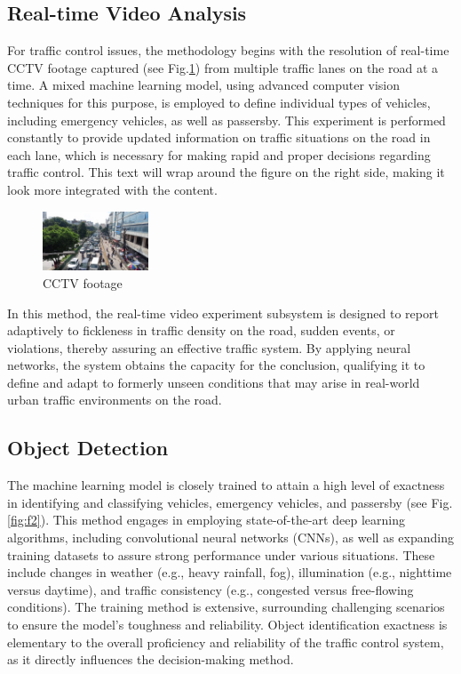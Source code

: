 \documentclass[usenatbib]{tjaa}
\begin{document}
\subsection{Real-time Video Analysis}
For traffic control issues, the methodology begins with the resolution of real-time CCTV footage captured (see Fig.\ref{fig:f1}) from multiple traffic lanes on the road at a time. A mixed machine learning model, using advanced computer vision techniques for this purpose, is employed to define individual types of vehicles, including emergency vehicles, as well as passersby. This experiment is performed constantly to provide updated information on traffic situations on the road in each lane, which is necessary for making rapid and proper decisions regarding traffic control. This text will wrap around the figure on the right side, making it look more integrated with the content.

\begin{figure}
    \centering
    \includegraphics[width=0.28\textwidth]{7.jpg}
    \caption{CCTV footage} %
    \label{fig:f1} %
\end{figure}

In this method, the real-time video experiment subsystem is designed to report adaptively to fickleness in traffic density on the road, sudden events, or violations, thereby assuring an effective traffic system. By applying neural networks, the system obtains the capacity for the conclusion, qualifying it to define and adapt to formerly unseen conditions that may arise in real-world urban traffic environments on the road.

\subsection{Object Detection}
The machine learning model is closely trained to attain a high level of exactness in identifying and classifying vehicles, emergency vehicles, and passersby (see Fig. \ref{fig:f2}). This method engages in employing state-of-the-art deep learning algorithms, including convolutional neural networks (CNNs), as well as expanding training datasets to assure strong performance under various situations. These include changes in weather (e.g., heavy rainfall, fog), illumination (e.g., nighttime versus daytime), and traffic consistency (e.g., congested versus free-flowing conditions). The training method is extensive, surrounding challenging scenarios to ensure the model's toughness and reliability. Object identification exactness is elementary to the overall proficiency and reliability of the traffic control system, as it directly influences the decision-making method. 
\end{document}
